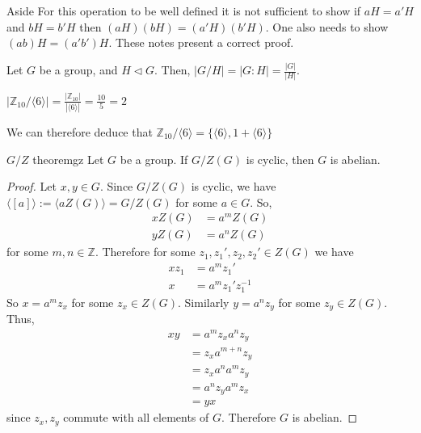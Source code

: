 \documentclass[12pt]{article}
\newcommand{\Z}{\mathbb{Z}}
\newcommand{\inv}{^{-1}}
\begin{document}
	\begin{myrem}{Aside}{}
		For this operation to be well defined it is not sufficient to show if $aH=a'H$ and $bH=b'H$ then $(aH)(bH)=(a'H)(b'H)$. One also needs to show $(ab)H=(a'b')H$. These notes present a correct proof.
	\end{myrem}
	
	\begin{mycor}{}{}
		Let $G$ be a group, and $H\lhd G$. Then, $|G/H|=|G:H|=\frac{|G|}{|H|}$.
	\end{mycor}
	
	\begin{myex}{}{}
		$|\Z_{10}/\langle 6\rangle|=\frac{|\Z_{10}|}{|\langle 6\rangle|}=\frac{10}{5}=2$
		
		We can therefore deduce that $\Z_{10}/\langle 6\rangle=\{\langle 6\rangle, 1+\langle 6\rangle\}$
	\end{myex}
	
	\begin{mythm}{$G/Z$ theorem}{gz}
		Let $G$ be a group. If $G/Z(G)$ is cyclic, then $G$ is abelian.
		\begin{proof}
			Let $x, y\in G$. Since $G/Z(G)$ is cyclic, we have $\langle [a]\rangle:=\langle aZ(G)\rangle=G/Z(G)$ for some $a\in G$. So,
			\begin{align*}
				xZ(G)&=a^mZ(G)\\
				yZ(G)&=a^nZ(G)
			\end{align*}
			for some $m, n\in\Z$. Therefore for some $z_1, z_1', z_2, z_2'\in Z(G)$ we have
			\begin{align*}
				xz_1&=a^mz_1'\\
				x&=a^mz_1'z_1\inv
			\end{align*}
			So $x=a^mz_x$ for some $z_x\in Z(G)$. Similarly $y=a^nz_y$ for some $z_y\in Z(G)$. Thus,
			\begin{align*}
				xy&=a^mz_xa^nz_y\\
				&=z_xa^{m+n}z_y\\
				&=z_xa^na^mz_y\\
				&=a^nz_ya^mz_x\\
				&=yx
			\end{align*}
			since $z_x, z_y$ commute with all elements of $G$. Therefore $G$ is abelian.
		\end{proof}
	\end{mythm}
	
\end{document}
